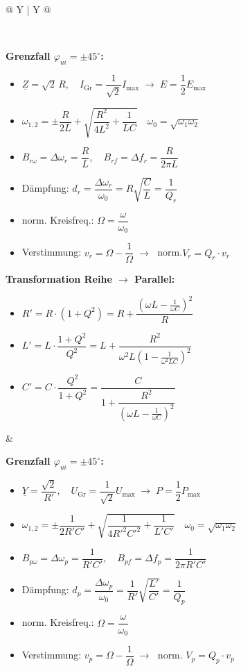 \documentclass[a4paper,11pt]{article}
\begin{document}
\begin{tabularx}{\textwidth}{@{} Y | Y @{}}
\begin{minipage}[t]{\linewidth}
\end{minipage}
\\
\hline

\begin{minipage}[t]{\linewidth}\centering
\vspace{2mm}
\textbf{Grenzfall $\varphi_{ui}=\pm 45^\circ$:}
\begin{itemize}
  \item $\underline{Z}=\sqrt{2}\,R,\quad I_{\mathrm{Gr}}=\dfrac{1}{\sqrt{2}}I_{\max} \;\rightarrow\; E=\dfrac{1}{2}E_{\max}$
  \item $\omega_{1,2}=\pm\dfrac{R}{2L}+\sqrt{\dfrac{R^2}{4L^2}+\dfrac{1}{LC}}\quad \omega_0 = \sqrt{\omega_1\omega_2}$
  \item $B_{r\omega}=\Delta\omega_r=\dfrac{R}{L},\quad B_{rf}=\Delta f_r=\dfrac{R}{2\pi L}$
  \item Dämpfung: $d_r=\dfrac{\Delta\omega_r}{\omega_0}=R\sqrt{\dfrac{C}{L}}=\dfrac{1}{Q_r}$
  \item norm. Kreisfreq.: $\Omega = \dfrac{\omega}{\omega_0}$
  \item Verstimmung: $v_r = \Omega - \dfrac{1}{\Omega} \;\rightarrow\;$ norm.$ V_r = Q_r \cdot v_r$
\end{itemize}

\vspace{2mm}
\textbf{Transformation Reihe $\rightarrow$ Parallel:}
\begin{itemize}
  \item $R' = R \cdot (1+Q^2) = R + \dfrac{\left(\omega L - \frac{1}{\omega C}\right)^2}{R}$
  \item $L' = L\cdot\dfrac{1+Q^2}{Q^2} = L + \dfrac{R^2}{\omega^2 L \left(1 - \frac{1}{\omega^2 LC}\right)^2}$
  \item $C' = C\cdot\dfrac{Q^2}{1+Q^2} = \dfrac{C}{1 + \dfrac{R^2}{\left(\omega L - \frac{1}{\omega C}\right)^2}}$
\end{itemize}
\end{minipage}
&
\begin{minipage}[t]{\linewidth}\centering
\vspace{2mm}
\textbf{Grenzfall $\varphi_{ui}=\pm 45^\circ$:}
\begin{itemize}
  \item $\underline{Y}=\dfrac{\sqrt{2}}{R'},\quad U_{\mathrm{Gr}}=\dfrac{1}{\sqrt{2}}U_{\max} \;\rightarrow\; P=\dfrac{1}{2}P_{\max}$
  \item $\omega_{1,2}=\pm\dfrac{1}{2R'C'}+\sqrt{\dfrac{1}{4R'^2C'^2}+\dfrac{1}{L'C'}}\quad \omega_0 = \sqrt{\omega_1\omega_2}$
  \item $B_{p\omega}=\Delta\omega_p=\dfrac{1}{R'C'},\quad B_{pf}=\Delta f_p=\dfrac{1}{2\pi R'C'}$
  \item Dämpfung: $d_p=\dfrac{\Delta\omega_p}{\omega_0}=\dfrac{1}{R'}\sqrt{\dfrac{L'}{C'}}=\dfrac{1}{Q_p}$
  \item norm. Kreisfreq.: $\Omega = \dfrac{\omega}{\omega_0}$
  \item Verstimmung: $v_p = \Omega - \dfrac{1}{\Omega} \;\rightarrow\;$ norm. $ V_p = Q_p \cdot v_p$
\end{itemize}


\end{minipage}
\end{tabularx}
\end{document}
